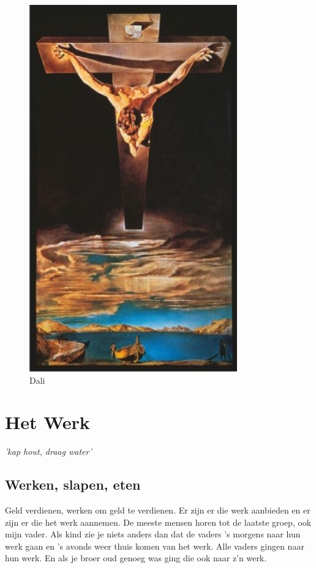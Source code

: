 \documentclass[12pt,twoside, openright]{memoir}
\begin{document}
\begin{figure}
\centering
\includegraphics[width=0.8\textwidth]{img/ch31/dali}
\caption*{\footnotesize Dali}
\end{figure}


\part{Het Werk}

\epigraph{\emph{'kap hout, draag water'}}{}

\chapter{Werken, slapen, eten} %
\label{cha:werkenslapen}

Geld verdienen, werken om geld te verdienen. Er zijn er die werk aanbieden en er zijn er die het werk aannemen. De meeste mensen horen tot de laatste groep, ook mijn vader. Als kind zie je niets anders dan dat de vaders ’s morgens naar hun werk gaan en ’s avonds weer thuis komen van het werk. Alle vaders gingen naar hun werk. En als je broer oud genoeg was ging die ook naar z’n werk.
\end{document}
